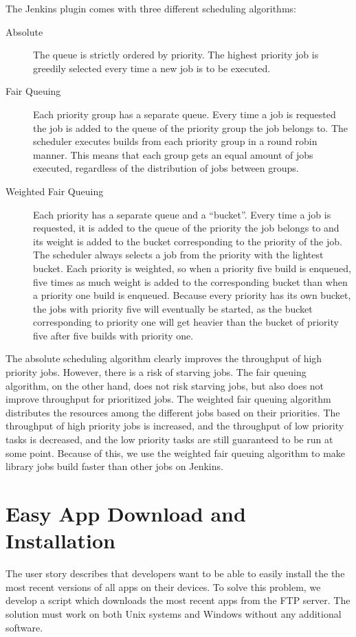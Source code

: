 The Jenkins plugin comes with three different scheduling algorithms:

\begin{description}
  \item[Absolute] The queue is strictly ordered by priority. The highest priority job is greedily selected every time a new job is to be executed.
  \item[Fair Queuing] Each priority group has a separate queue. Every time a job is requested the job is added to the queue of the priority group the job belongs to. The scheduler executes builds from each priority group in a round robin manner. This means that each group gets an equal amount of jobs executed, regardless of the distribution of jobs between groups.
  \item[Weighted Fair Queuing] Each priority has a separate queue and a ``bucket''. Every time a job is requested, it is added to the queue of the priority the job belongs to and its weight is added to the bucket corresponding to the priority of the job. The scheduler always selects a job from the priority with the lightest bucket. Each priority is weighted, so when a priority five build is enqueued, five times as much weight is added to the corresponding bucket than when a priority one build is enqueued. Because every priority has its own bucket, the jobs with priority five will eventually be started, as the bucket corresponding to priority one will get heavier than the bucket of priority five after five builds with priority one.
\end{description}

The absolute scheduling algorithm clearly improves the throughput of high priority jobs. However, there is a risk of starving jobs. The fair queuing algorithm, on the other hand, does not risk starving jobs, but also does not improve throughput for prioritized jobs. The weighted fair queuing algorithm distributes the resources among the different jobs based on their priorities. The throughput of high priority jobs is increased, and the throughput of low priority tasks is decreased, and the low priority tasks are still guaranteed to be run at some point. Because of this, we use the weighted fair queuing algorithm to make library jobs build faster than other jobs on Jenkins.

\section{Easy App Download and Installation}\label{sec:appdownloadscript}
The user story  describes that developers want to be able to easily install the the most recent versions of all apps on their devices. To solve this problem, we develop a script which downloads the most recent apps from the FTP server. The solution must work on both Unix systems and Windows without any additional software.

